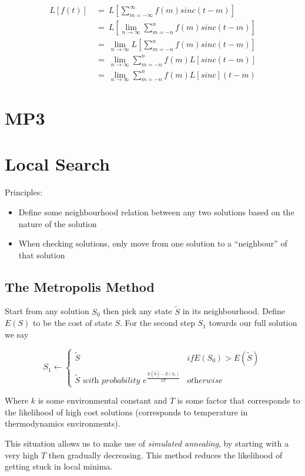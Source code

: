 \documentclass[a4paper]{article}
\begin{document}
\begin{align*}
	L[f(t)]\ &=\ L[\sum\limits_{m=-\infty}^{\infty}f(m)sinc(t-m)] \\
	&=\ L[\lim\limits_{n\to\infty}\sum\limits_{m=-n}^{n}f(m)sinc(t-m)] \\
	&=\ \lim\limits_{n\to\infty} L[\sum\limits_{m=-n}^{n}f(m)sinc(t-m)] \\
	&=\ \lim\limits_{n\to\infty}\sum\limits_{m=-n}^{n} f(m)L[sinc(t-m)] \\
	&=\ \lim\limits_{n\to\infty}\sum\limits_{m=-n}^{n} f(m)L[sinc](t-m) 
\end{align*}	

\section{MP3}


\section{Local Search}

Principles:
\begin{itemize}
	\item Define some neighbourhood relation between any two solutions based on the nature of the solution
	\item When checking solutions, only move from one solution to a ``neighbour'' of that solution
\end{itemize}

\subsection{The Metropolis Method}
Start from any solution $S_0$ then pick any state $\tilde{S}$ in its neighbourhood. Define $E(S)$ to be the cost of state $S$. For the second step $S_1$ towards our full solution we say

$$S_1 \gets \begin{cases} \tilde{S} & if E(S_0) > E(\tilde{S}) \\ \tilde{S} \textit{ with probability } e^{\frac{E(\tilde{S}) - E(S_1)}{kT}}&\textit{otherwise}\end{cases}$$

Where $k$ is some environmental constant and $T$ is some factor that corresponds to the likelihood of high cost solutions (corresponds to temperature in thermodynamics environments).

This situation allows us to make use of \textit{simulated annealing}, by starting with a very high $T$ then gradually decreasing. This method reduces the likelihood of getting stuck in local minima.
\end{document}
